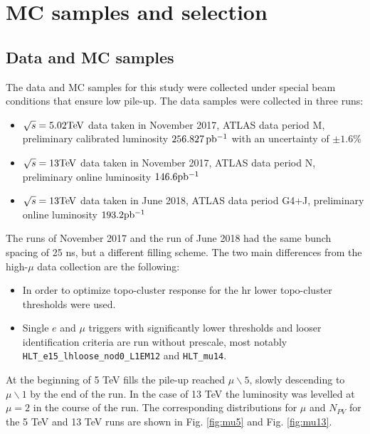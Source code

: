 \chapter{MC samples and selection}
    
    
    \section{Data and MC samples}
    The data and MC samples for this study were collected under special beam conditions that ensure low pile-up. The data samples were collected in three runs:
    \begin{itemize}
    \item $\sqrt{s} = 5.02\text{Te\kern -0.1em V}$ data taken in November 2017, ATLAS data
    period M, preliminary calibrated luminosity $256.827\,\mbox{pb\(^{-1}\)}$ with an uncertainty
    of $\pm 1.6\%$
    \item $\sqrt{s} = 13\text{Te\kern -0.1em V}$ data taken in November 2017, ATLAS data
    period N, preliminary online luminosity $146.6\mbox{pb\(^{-1}\)}$
    \item $\sqrt{s} = 13\text{Te\kern -0.1em V}$ data taken in June 2018, ATLAS data
    period G4+J, preliminary online luminosity $193.2\mbox{pb\(^{-1}\)}$
    \end{itemize}
	The runs of November 2017 and the run of June 2018 had the same bunch spacing of 25 ns, but a different filling scheme. The two main differences from the high-$\mu$ data collection are the following:
	\begin{itemize}
	\item In order to optimize topo-cluster response for the \gls{hr} lower topo-cluster thresholds were used. 
	\item Single $e$ and $\mu$ triggers with significantly lower
	thresholds and looser identification criteria are run without
	prescale, most notably \texttt{HLT\_e15\_lhloose\_nod0\_L1EM12} and
	\texttt{HLT\_mu14}.
	\end{itemize}	
	At the beginning of 5 TeV fills the pile-up reached $\mu \backslash 5$, slowly descending to $\mu \backslash 1$ by the end of the run. In the case of 13 TeV the luminosity was levelled at $\mu = 2$ in the course of the run. The corresponding distributions for $\mu$ and $N_{PV}$ for the 5 TeV and 13 TeV runs are shown in Fig. \ref{fig:mu5} and Fig. \ref{fig:mu13}.
